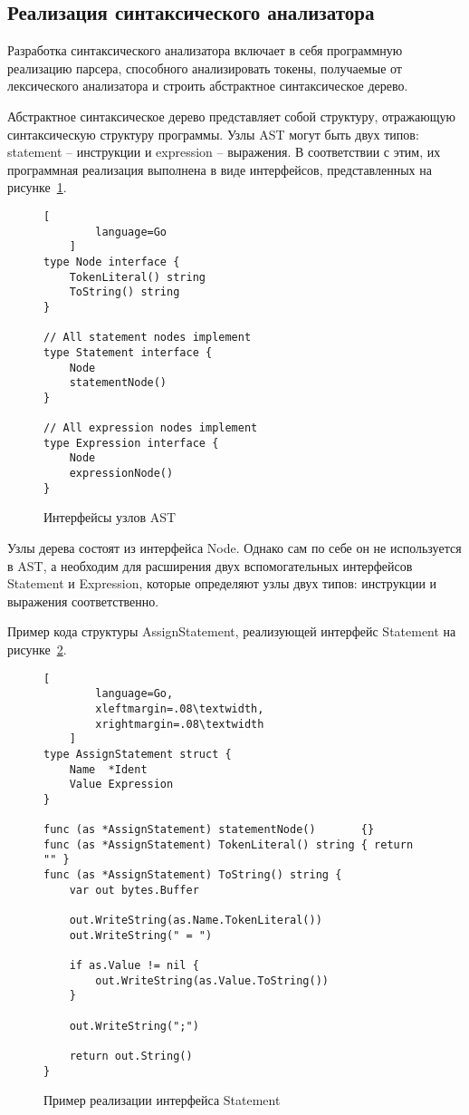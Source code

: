 \subsection{Реализация синтаксического анализатора}

Разработка синтаксического анализатора включает в себя программную реализацию парсера, способного анализировать токены, получаемые от лексического анализатора и строить абстрактное синтаксическое дерево.

Абстрактное синтаксическое дерево представляет собой структуру, отражающую синтаксическую структуру программы.
Узлы AST могут быть двух типов: statement -- инструкции и expression -- выражения. 
В соответствии с этим, их программная реализация выполнена в виде интерфейсов, представленных на рисунке~\ref{f:code_astInterfaces}.

\begin{figure}[ht]
	\centering
	\vspace{\toppaddingoffigure}
	\begin{lstlisting}[
        language=Go
    ]
type Node interface {
    TokenLiteral() string
    ToString() string
}

// All statement nodes implement
type Statement interface {
    Node
    statementNode()
}

// All expression nodes implement
type Expression interface {
    Node
    expressionNode()
} 
\end{lstlisting}
	\caption{Интерфейсы узлов AST}
	\label{f:code_astInterfaces}
\end{figure}

Узлы дерева состоят из интерфейса Node.
Однако сам по себе он не используется в AST, а необходим для расширения двух вспомогательных интерфейсов Statement и Expression, которые определяют узлы двух типов: инструкции и выражения соответственно.

Пример кода структуры AssignStatement, реализующей интерфейс Statement на рисунке~\ref{f:code_IStatementExample}.

\clearpage

\begin{figure}[!htb]
	\centering
	\begin{lstlisting}[
        language=Go,
        xleftmargin=.08\textwidth,
        xrightmargin=.08\textwidth
    ]
type AssignStatement struct {
    Name  *Ident
    Value Expression
}

func (as *AssignStatement) statementNode()       {}
func (as *AssignStatement) TokenLiteral() string { return "" }
func (as *AssignStatement) ToString() string {
    var out bytes.Buffer

    out.WriteString(as.Name.TokenLiteral())
    out.WriteString(" = ")

    if as.Value != nil {
        out.WriteString(as.Value.ToString())
    }

    out.WriteString(";")

    return out.String()
}
\end{lstlisting}
	\caption{Пример реализации интерфейса Statement}
	\label{f:code_IStatementExample}
\end{figure}

